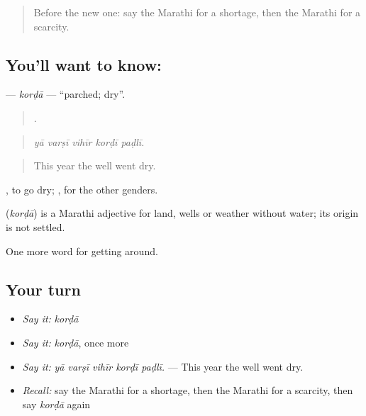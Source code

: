 \label{lesson:MR-C435-korda}



\begin{quote}
Before the new one: say the Marathi for a shortage, then the Marathi for a scarcity.
\end{quote}

\subsection*{You'll want to know: }
\textbf{} — \emph{korḍā} — \textquotedblleft{}parched; dry\textquotedblright{}.

\begin{quote}
    .
\end{quote}

\begin{quote}
\emph{yā varṣī vihīr korḍī paḍlī.}
\end{quote}

\begin{quote}
This year the well went dry.
\end{quote}

 , to go dry; ,  for the other genders.

\begin{cousinweb}
\textbf{} (\emph{korḍā}) is a Marathi adjective for land, wells or weather without water; its origin is not settled.
\end{cousinweb}

\begin{grammarlens}[title={What you've built}]
One more word for getting around.
\end{grammarlens}

\subsection*{Your turn}
\begin{itemize}
\raggedright
  \item \emph{Say it:} \emph{korḍā}
  \item \emph{Say it:} \emph{korḍā}, once more
  \item \emph{Say it:} \emph{yā varṣī vihīr korḍī paḍlī.} — This year the well went dry.
  \item \emph{Recall:} say the Marathi for a shortage, then the Marathi for a scarcity, then say \emph{korḍā} again
\end{itemize}

